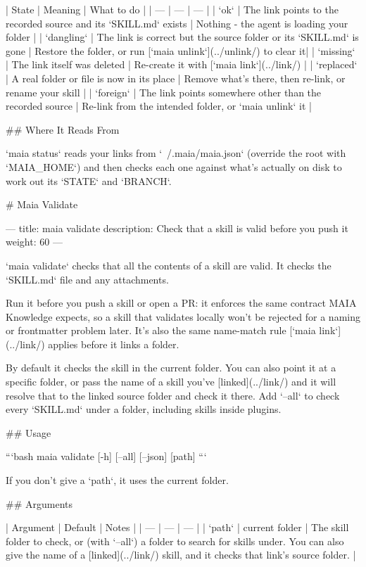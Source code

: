 | State | Meaning | What to do |
| --- | --- | --- |
| `ok` | The link points to the recorded source and its `SKILL.md` exists | Nothing - the agent is loading your folder |
| `dangling` | The link is correct but the source folder or its `SKILL.md` is gone | Restore the folder, or run [`maia unlink`](../unlink/) to clear it|
| `missing` | The link itself was deleted | Re-create it with [`maia link`](../link/) |
| `replaced` | A real folder or file is now in its place | Remove what's there, then re-link, or rename your skill |
| `foreign` | The link points somewhere other than the recorded source | Re-link from the intended folder, or `maia unlink` it |

## Where It Reads From

`maia status` reads your links from `~/.maia/maia.json` (override the root with `MAIA_HOME`) and then checks each one against what's actually on disk to work out its `STATE` and `BRANCH`.




# Maia Validate

---
title: maia validate
description: Check that a skill is valid before you push it
weight: 60
---

`maia validate` checks that all the contents of a skill are valid.
It checks the `SKILL.md` file and any attachments.

Run it before you push a skill or open a PR: it enforces the same contract MAIA Knowledge expects, so a skill that validates locally won't be rejected for a naming or frontmatter problem later.
It's also the same name-match rule [`maia link`](../link/) applies before it links a folder.

By default it checks the skill in the current folder.
You can also point it at a specific folder, or pass the name of a skill you've [linked](../link/) and it will resolve that to the linked source folder and check it there.
Add `--all` to check every `SKILL.md` under a folder, including skills inside plugins.

## Usage

```bash
maia validate [-h] [--all] [--json] [path]
```

If you don't give a `path`, it uses the current folder.

## Arguments

| Argument | Default | Notes |
| --- | --- | --- |
| `path` | current folder | The skill folder to check, or (with `--all`) a folder to search for skills under. You can also give the name of a [linked](../link/) skill, and it checks that link's source folder. |

